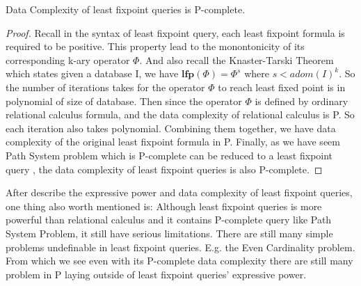 \begin{claim}
Data Complexity of least fixpoint queries is P-complete.
\end{claim}
\begin{proof}
Recall in the syntax of least fixpoint query, each least fixpoint formula is required to be positive. This property lead to the monontonicity of its corresponding k-ary operator $\Phi$. And also recall the Knaster-Tarski Theorem which states given a database I, we have $\textbf{lfp}(\Phi)=\Phi^s$ where $s<adom(I)^k$. So the number of iterations takes for the operator $\Phi$ to reach least fixed point is in polynomial of size of database. Then since the operator $\Phi$ is defined by ordinary relational calculus formula, and the data complexity of relational calculus is P. So each iteration also takes polynomial. Combining them together, we have data complexity of the original least fixpoint formula in P. Finally, as we have seem Path System problem which is P-complete can be reduced to a least fixpoint query , the data complexity of least fixpoint queries is also P-complete. 
\end{proof}

After describe the expressive power and data complexity of least fixpoint queries, one thing also worth mentioned is: Although least fixpoint queries is more powerful than relational calculus and it contains P-complete query like Path System Problem, it still have serious limitations. There are still many simple problems undefinable in least fixpoint queries. E.g. the Even Cardinality problem\cite{kolaitis1}. From which we see even with its P-complete data complexity there are still many problem in P laying outside of least fixpoint queries' expressive power.



